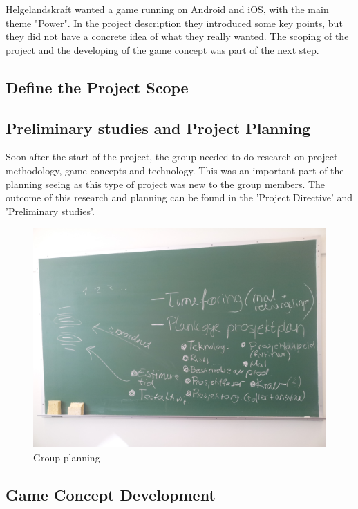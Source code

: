 	Helgelandskraft wanted a game running on Android and iOS, with the main theme "Power".
	In the project description they introduced some key points, but they did not have a
	concrete idea of what they really wanted. The scoping of the project and the developing
	of the game concept was part of the next step.

\subsection{Define the Project Scope}


\subsection{Preliminary studies and Project Planning}
	Soon after the start of the project, the group needed to do research on project methodology, 
	game concepts and technology. This was an important part of the planning seeing as this type of 
	project was new to the group members. The outcome of this research and planning can be found 
	in the 'Project Directive' and 'Preliminary studies'.

	\begin{figure}[H]
		\includegraphics[scale=0.10]{pictures/projectPlanning.jpg}
		\caption{Group planning}
	\end{figure}

\subsection{Game Concept Development}
	
